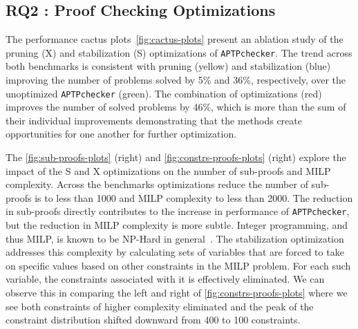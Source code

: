 \documentclass[oneside,11pt,dvipsnames]{book}
\newcommand{\ignore}[1]{}
\newcommand{\nnproofchecker}{\texttt{APTPchecker}}
\begin{document}
\subsection{RQ2 : Proof Checking Optimizations}
\label{sec:rq2}
The performance cactus plots~\autoref{fig:cactus-plots} present an ablation
study of the 
pruning (X) and stabilization (S) optimizations of \nnproofchecker{}.
The trend across both benchmarks is consistent with pruning (yellow) and stabilization (blue)
 improving the number of problems solved by 5\% and 36\%, respectively, over the unoptimized
\nnproofchecker{} (green).
The combination of optimizations (red) improves the number of solved problems by 46\%, which is more than the sum of their individual improvements demonstrating that the methods create opportunities for one another for further optimization.
\ignore{
- neither X nor S: 168 (F) + 88 (C) = 256
- X: 175 (F) + 93 (C) = 268
- S: 178 (F) + 170 (C) = 348
}

The \autoref{fig:sub-proofs-plots} (right) and \autoref{fig:constrs-proofs-plots} (right) explore the impact of the S and X optimizations on the number of sub-proofs and MILP complexity.  Across the benchmarks optimizations reduce 
the number of sub-proofs is to less than 1000 and
MILP complexity to less than 2000.   
The reduction in sub-proofs directly contributes to the increase
in performance of \nnproofchecker{}, but the reduction in
MILP complexity is more subtle.   
Integer programming, and thus MILP, is known to be
NP-Hard in general~\cite{garey1979computers}.
The stabilization optimization addresses this complexity by
calculating sets of variables that are forced to take on specific
values based on other constraints in the MILP problem.  For each
such variable, the constraints associated with it is effectively
eliminated.  We can observe this in comparing the left and
right of \autoref{fig:constrs-proofs-plots} where we see both
constraints of higher complexity eliminated and the peak of
the constraint distribution shifted downward from 400 to 100
constraints.  

\ignore{
Sub-problem size
- without S+X:
    + mean: 388
    + std: 1062
- with S+X
    + mean: 142
    + std: 152

MILP complexity
- without S+X: 
    + mean: 329
    + std: 274
- with S+X
    + mean: 493
    + std 449

We performed an analysis of the relationship between size of constraints and number of sub-proofs and determined that these factors are not strongly correlated.
For example, there is a 1 layer CNN model with 27k parameters whose verification
generates 680 sub-proofs where the complexity of the constraints in that proof are at most 109. 
On the other end of the spectrum, verification of a 2 layer CNN model with 180k parameters only requires 81 sub-proofs, but those proofs consist of constraints with complexity of at least 1721.
}
\end{document}

